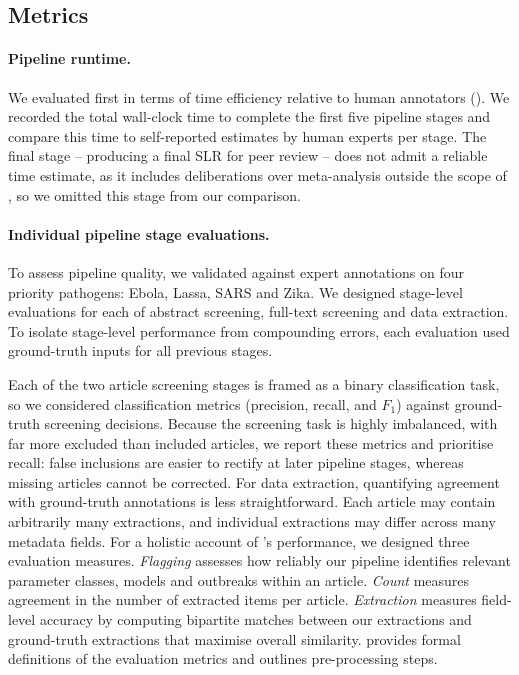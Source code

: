 \subsection{Metrics}

\paragraph{Pipeline runtime.} We evaluated \name{} first in terms of time efficiency relative to human annotators (). We recorded the total wall-clock time to complete the first five pipeline stages and compare this time to self-reported estimates by human experts per stage. The final stage -- producing a final SLR for peer review -- does not admit a reliable time estimate, as it includes deliberations over meta-analysis outside the scope of \name{}, so we omitted this stage from our comparison.

\paragraph{Individual pipeline stage evaluations.} To assess pipeline quality, we validated against expert annotations on four priority pathogens: Ebola, Lassa, SARS and Zika. 
We designed stage-level evaluations for each of abstract screening, full-text screening and data extraction. To isolate stage-level performance from compounding errors, each evaluation used ground-truth inputs for all previous stages.

Each of the two article screening stages is framed as a binary classification task, so we considered classification metrics (precision, recall, and $F_1$) against ground-truth screening decisions. Because the screening task is highly imbalanced, with far more excluded than included articles, we report these metrics and prioritise recall: false inclusions are easier to rectify at later pipeline stages, whereas missing articles cannot be corrected. For data extraction, quantifying agreement with ground-truth annotations is less straightforward. Each article may contain arbitrarily many extractions, and individual extractions may differ across many metadata fields. For a holistic account of \name's performance, we designed three evaluation measures. \textit{Flagging} assesses how reliably our pipeline identifies relevant parameter classes, models and outbreaks within an article. \textit{Count} measures agreement in the number of extracted items per article. \textit{Extraction} measures field-level accuracy by computing bipartite matches between our extractions and ground-truth extractions that maximise overall similarity.  provides formal definitions of the evaluation metrics and outlines pre-processing steps.


